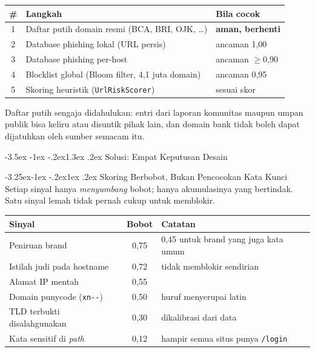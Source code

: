\documentclass[11pt,a4paper]{article}
\makeatletter
\renewcommand\section{\@startsection{section}{1}{\z@}%
  {-3.5ex \@plus -1ex \@minus -.2ex}{1.3ex \@plus.2ex}%
  {\normalfont\Large\bfseries\color{navy}}}
\renewcommand\subsection{\@startsection{subsection}{2}{\z@}%
  {-3.25ex\@plus -1ex \@minus -.2ex}{1ex \@plus.2ex}%
  {\normalfont\large\bfseries\color{brandblue}}}
\makeatother
\begin{document}
\begin{center}
\begin{tabularx}{\textwidth}{@{}c X l@{}}
  \toprule
  \# & \textbf{Langkah} & \textbf{Bila cocok} \\
  \midrule
  1 & Daftar putih domain resmi (BCA, BRI, OJK, \ldots) & \textbf{aman, berhenti} \\
  2 & Database phishing lokal (URL persis) & ancaman 1{,}00 \\
  3 & Database phishing per-host & ancaman $\geq$0{,}90 \\
  4 & Blocklist global (Bloom filter, 4{,}1 juta domain) & ancaman 0{,}95 \\
  5 & Skoring heuristik (\texttt{UrlRiskScorer}) & sesuai skor \\
  \bottomrule
\end{tabularx}
\end{center}

Daftar putih sengaja didahulukan: entri dari laporan komunitas maupun umpan
publik bisa keliru atau disuntik pihak lain, dan domain bank tidak boleh
dapat dijatuhkan oleh sumber semacam itu.

\section{Solusi: Empat Keputusan Desain}

\subsection{Skoring Berbobot, Bukan Pencocokan Kata Kunci}
Setiap sinyal hanya \emph{menyumbang} bobot; hanya akumulasinya yang
bertindak. Satu sinyal lemah tidak pernah cukup untuk memblokir.

\begin{center}
\begin{tabularx}{\textwidth}{@{}X c X@{}}
  \toprule
  \textbf{Sinyal} & \textbf{Bobot} & \textbf{Catatan} \\
  \midrule
  Peniruan brand & 0{,}75 & 0{,}45 untuk brand yang juga kata umum \\
  Istilah judi pada hostname & 0{,}72 & tidak memblokir sendirian \\
  Alamat IP mentah & 0{,}55 & \\
  Domain punycode (\texttt{xn-{}-}) & 0{,}50 & huruf menyerupai latin \\
  TLD terbukti disalahgunakan & 0{,}30 & dikalibrasi dari data \\
  Kata sensitif di \emph{path} & 0{,}12 & hampir semua situs punya \texttt{/login} \\
  \bottomrule
\end{tabularx}
\end{center}
\end{document}
